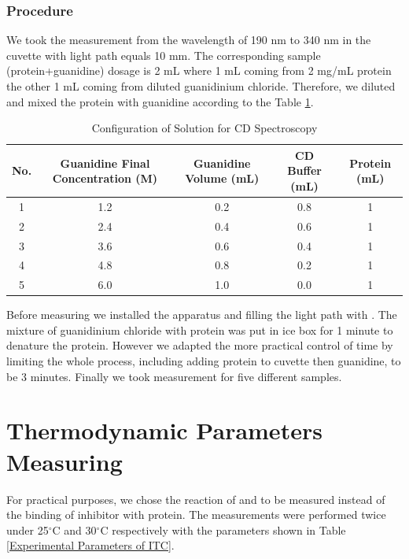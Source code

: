 \documentclass{report}
\begin{document}
\subsubsection{Procedure}
We took the measurement from the wavelength of 190 nm to 340 nm in the cuvette with light path equals 10 mm.
The corresponding sample (protein+guanidine) dosage is 2 mL where 1 mL coming from 2 mg/mL protein the other 1 mL coming from diluted guanidinium chloride.
Therefore, we diluted and mixed the protein with guanidine according to the Table \ref{Configuration of Solution for CD Spectroscopy}.
\begin{table}
    \centering
    \caption{Configuration of Solution for CD Spectroscopy}
    \label{Configuration of Solution for CD Spectroscopy}
    \begin{tabular}{|c|c|c|c|c|}
        \toprule
        No. & Guanidine Final Concentration (M) & Guanidine Volume (mL) & CD Buffer (mL) & Protein (mL) \\
        \midrule
        1 & 1.2 & 0.2 & 0.8 & 1 \\
        2 & 2.4 & 0.4 & 0.6 & 1 \\
        3 & 3.6 & 0.6 & 0.4 & 1 \\
        4 & 4.8 & 0.8 & 0.2 & 1 \\
        5 & 6.0 & 1.0 & 0.0 & 1 \\
        \bottomrule
    \end{tabular}
\end{table}

Before measuring we installed the apparatus and filling the light path with .
The mixture of guanidinium chloride with protein was put in ice box for 1 minute to denature the protein.
However we adapted the more practical control of time by limiting the whole process, including adding protein to cuvette then guanidine, to be 3 minutes.
Finally we took measurement for five different samples.

\section{Thermodynamic Parameters Measuring}
For practical purposes, we chose the reaction of  and  to be measured instead of the binding of inhibitor with protein.
The measurements were performed twice under 25$^\circ$C and 30$^\circ$C respectively with the parameters shown in Table \ref{Experimental Parameters of ITC}.
\end{document}
